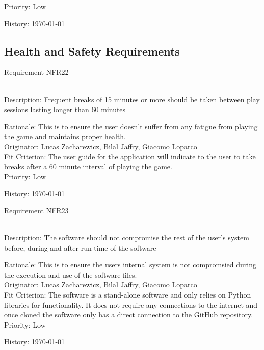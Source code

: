 \documentclass[12pt, titlepage]{article}
\begin{document}
\begin{enumerate}
{\color{blue}Priority: Low}
  
{\color{blue}History: \today}

\subsection{Health and Safety Requirements}

{\color{blue}\item  Requirement NFR22}\\
{\color{blue}Description:} Frequent breaks of 15 minutes or more should be taken between play sessions lasting longer than 60 minutes

{\color{blue}Rationale: This is to ensure the user doesn't suffer from any fatigue from playing the game and maintains proper health.}\\

{\color{blue}Originator:  Lucas Zacharewicz, Bilal Jaffry, Giacomo Loparco}\\

{\color{blue}Fit Criterion: The user guide for the application will indicate to the user to take breaks after a 60 minute interval of playing the game.}\\
 
{\color{blue}Priority: Low}
  
{\color{blue}History: \today}

{\color{blue}\item Requirement NFR23}\\
{\color{blue}Description: } The software should not compromise the rest of the user’s system before, during and after run-time of the software

{\color{blue}Rationale: This is to ensure the users internal system is not compromsied during the execution and use of the software files.}\\

{\color{blue}Originator:  Lucas Zacharewicz, Bilal Jaffry, Giacomo Loparco}\\

{\color{blue}Fit Criterion: The software is a stand-alone software and only relies on Python libraries for functionality. It does not require any connections to the internet and once cloned the software only has a direct connection to the GitHub repository.}\\
 
{\color{blue}Priority: Low}
  
{\color{blue}History: \today}

\end{enumerate}
\end{document}
